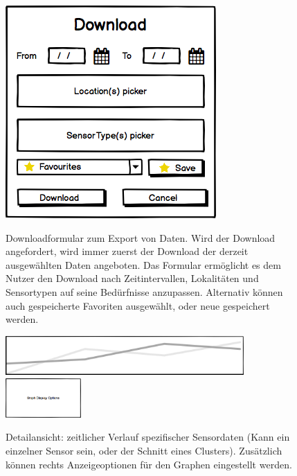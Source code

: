 \begin{figure}[H]
	\centering
	\includegraphics[width=0.5\linewidth]{gui/frontend/FrontGUIExportForm.png}\\
	\caption{Downloadformular zum Export von Daten. Wird der Download angefordert, wird immer zuerst der Download der derzeit ausgewählten Daten angeboten. Das Formular ermöglicht es dem Nutzer den Download nach Zeitintervallen, Lokalitäten und Sensortypen auf seine Bedürfnisse anzupassen. Alternativ können auch gespeicherte Favoriten ausgewählt, oder neue gespeichert werden.}
\end{figure}
\newpage
\begin{figure}[H]
	\centering
	\includegraphics[height=1.5cm]{gui/frontend/FrontGUIDetailGraph.png}
	\hspace{0.1cm}
	\includegraphics[height=1.5cm]{gui/frontend/FrontGUIGraphSettings.png}
	\caption{Detailansicht: zeitlicher Verlauf spezifischer Sensordaten (Kann ein einzelner Sensor sein, oder der Schnitt eines Clusters). Zusätzlich können rechts Anzeigeoptionen für den Graphen eingestellt werden.}
\end{figure}

